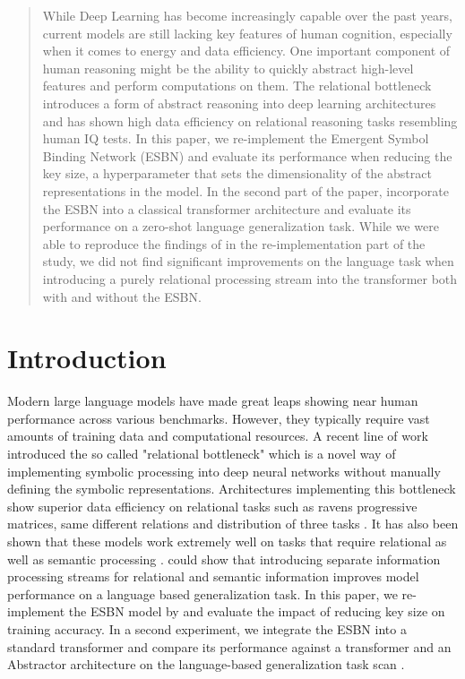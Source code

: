 \begin{abstract}
While Deep Learning has become increasingly capable over the past years, current models are still lacking key features of human cognition, especially  when it comes to energy and data efficiency. One important component of human reasoning might be the ability to quickly abstract high-level features and perform computations on them. The relational bottleneck \textcite{webb_relational_2023} introduces a form of abstract reasoning into deep learning architectures and has shown high data efficiency on relational reasoning tasks resembling human IQ tests. In this paper, we re-implement the Emergent Symbol Binding Network (ESBN) \textcite{webb_emergent_2021} and evaluate its performance when reducing the key size, a hyperparameter that sets the dimensionality of the abstract representations in the model. In the second part of the paper, incorporate the ESBN into a classical transformer architecture and evaluate its performance on a zero-shot language generalization task. While we were able to reproduce the findings of \textcite{webb_emergent_2021} in the re-implementation part of the study, we did not find significant improvements on the language task when introducing a purely relational processing stream into the transformer both with and without the ESBN.
\end{abstract}

\section{Introduction}
Modern large language models have made great leaps showing near human performance across various benchmarks. However, they typically require vast amounts of training data and computational resources. A recent line of work introduced the so called "relational bottleneck" \textcite{webb_relational_2023} which is a novel way of implementing symbolic processing into deep neural networks without manually defining the symbolic representations. Architectures implementing this bottleneck show superior data efficiency on relational tasks such as ravens progressive matrices, same different relations and distribution of three tasks \textcite{webb_relational_2023}. It has also been shown that these models work extremely well on tasks that require relational as well as semantic processing \textcite{altabaa_abstractors_2023}. \newline
\textcite{russin_compositional_2019} could show that introducing separate information processing streams for relational and semantic information improves model performance on a language based generalization task. 
In this paper, we re-implement the ESBN model by \textcite{webb_emergent_2021} and evaluate the impact of reducing key size on training accuracy. In a second experiment, we integrate the ESBN into a standard transformer \textcite{vaswani_attention_2023} and compare its performance against a transformer and an Abstractor \textcite{altabaa_abstractors_2023} architecture on the language-based generalization task scan \textcite{lake_generalization_2018}.


